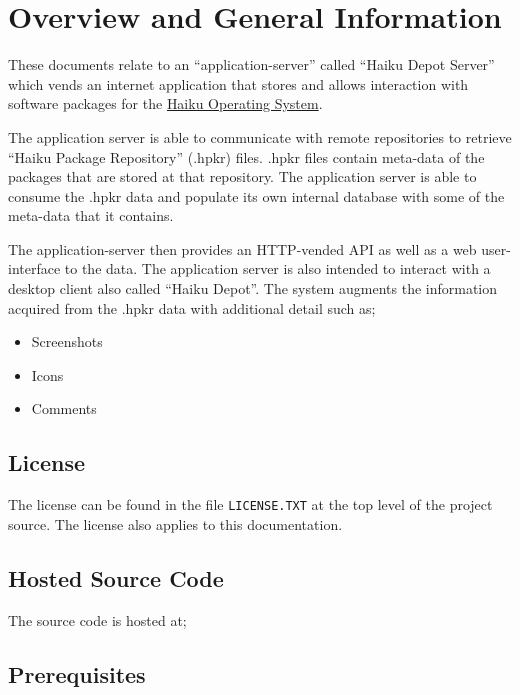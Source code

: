 
\section{Overview and General Information}

These documents relate to an ``application-server'' called ``Haiku Depot Server'' which vends an internet application that stores and allows interaction with software packages for the \href{http://www.haiku-os.org}{Haiku Operating System}.

The application server is able to communicate with remote repositories to retrieve ``Haiku Package Repository'' (.hpkr) files.  .hpkr files contain meta-data of the packages that are stored at that repository.  The application server is able to consume the .hpkr data and populate its own internal database with some of the meta-data that it contains.

The application-server then provides an HTTP-vended API as well as a web user-interface to the data.  The application server is also intended to interact with a desktop client also called ``Haiku Depot''.  The system augments the information acquired from the .hpkr data with additional detail such as;

\begin{itemize}
\item Screenshots
\item Icons
\item Comments
\end{itemize}

\subsection{License}

The license can be found in the file {\tt LICENSE.TXT} at the top level of the project source.  The license also applies to this documentation.

\subsection{Hosted Source Code}

The source code is hosted at;


\subsection{Prerequisites}
\label{prerequisites}


